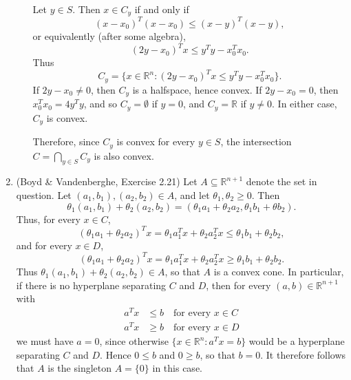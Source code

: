 \documentclass[letterpaper,12pt]{article}
\begin{document}
\begin{enumerate}
\begin{enumerate}
  Let $y \in S$. Then $x \in C_y$ if and only if
  \begin{equation*}
    (x - x_0)^T (x - x_0) \leq (x - y)^T (x - y),
  \end{equation*}
  or equivalently (after some algebra),
  \begin{equation*}
    (2y - x_0)^T x \leq y^T y - x_0^T x_0.
  \end{equation*}
  Thus
  \begin{equation*}
    C_y = \{x \in \mathbb{R}^n : (2y - x_0)^T x \leq y^T y - x_0^T x_0\}.
  \end{equation*}
  If $2y - x_0 \neq 0$, then $C_y$ is a halfspace, hence convex. If
  $2y - x_0 = 0$, then $x_0^T x_0 = 4y^T y$, and so $C_y = \emptyset$
  if $y = 0$, and $C_y = \mathbb{R}$ if $y \neq 0$. In either case,
  $C_y$ is convex.

  Therefore, since $C_y$ is convex for every $y \in S$, the
  intersection $C = \bigcap_{y \in S} C_y$ is also convex.
\end{enumerate}

\item (Boyd \& Vandenberghe, Exercise 2.21) Let
  $A \subseteq \mathbb{R}^{n+1}$ denote the set in question. Let
  $(a_1, b_1), (a_2, b_2) \in A$, and let $\theta_1, \theta_2 \geq
  0$. Then
  \begin{equation*}
    \theta_1 (a_1, b_1) + \theta_2 (a_2, b_2)
      = (\theta_1 a_1 + \theta_2 a_2, \theta_1 b_1 + \theta b_2).
  \end{equation*}
  Thus, for every $x \in C$,
  \begin{equation*}
    (\theta_1 a_1 + \theta_2 a_2)^T x
      = \theta_1 a_1^T x + \theta_2 a_2^T x
      \leq \theta_1 b_1 + \theta_2 b_2,
  \end{equation*}
  and for every $x \in D$,
  \begin{equation*}
    (\theta_1 a_1 + \theta_2 a_2)^T x
      = \theta_1 a_1^T x + \theta_2 a_2^T x
      \geq \theta_1 b_1 + \theta_2 b_2.
  \end{equation*}
  Thus $\theta_1 (a_1, b_1) + \theta_2 (a_2, b_2) \in A$, so that $A$
  is a convex cone. In particular, if there is no hyperplane
  separating $C$ and $D$, then for every
  $(a, b) \in \mathbb{R}^{n+1}$ with
  \begin{align*}
    a^T x &\leq b \quad \text{for every $x \in C$} \\
    a^T x &\geq b \quad \text{for every $x \in D$}
  \end{align*}
  we must have $a = 0$, since otherwise
  $\{x \in \mathbb{R}^n : a^T x = b\}$ would be a hyperplane
  separating $C$ and $D$. Hence $0 \leq b$ and $0 \geq b$, so that
  $b = 0$. It therefore follows that $A$ is the singleton $A = \{0\}$
  in this case.


\end{enumerate}
\end{document}
